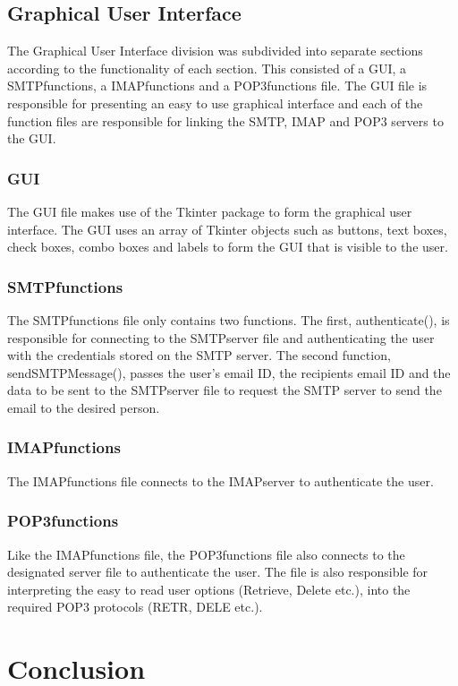 \documentclass[11pt]{article}
\begin{document}
\begin{multicols}{2}
\subsection{Graphical User Interface}
The Graphical User Interface division was subdivided into separate sections according to the functionality of each section. This consisted of a GUI, a SMTPfunctions, a IMAPfunctions and a POP3functions file. The GUI file is responsible for presenting an easy to use graphical interface and each of the function files are responsible for linking the SMTP, IMAP and POP3 servers to the GUI.
\subsubsection{GUI}
The GUI file makes use of the Tkinter package to form the graphical user interface. The GUI uses an array of Tkinter objects such as buttons, text boxes, check boxes, combo boxes and labels to form the GUI that is visible to the user.
\subsubsection{SMTPfunctions}
The SMTPfunctions file only contains two functions. The first, authenticate(), is responsible for connecting to the SMTPserver file and authenticating the user with the credentials stored on the SMTP server. The second function, sendSMTPMessage(), passes the user's email ID, the recipients email ID and the data to be sent to the SMTPserver file to request the SMTP server to send the email to the desired person.
\subsubsection{IMAPfunctions}
The IMAPfunctions file connects to the IMAPserver to authenticate the user.
\subsubsection{POP3functions}
Like the IMAPfunctions file, the POP3functions file also connects to the designated server file to authenticate the user. The file is also responsible for interpreting the easy to read user options (Retrieve, Delete etc.), into the required POP3 protocols (RETR, DELE etc.).
\section{Conclusion}

\end{multicols}
\end{document}
